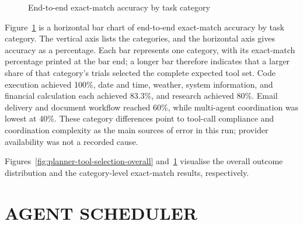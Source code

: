 \begin{figure}[H]
\centering
{}
\caption{End-to-end exact-match accuracy by task category}
\label{fig:planner-tool-selection-category}
\end{figure}

Figure~\ref{fig:planner-tool-selection-category} is a horizontal bar chart of end-to-end exact-match accuracy by task category. The vertical axis lists the categories, and the horizontal axis gives accuracy as a percentage. Each bar represents one category, with its exact-match percentage printed at the bar end; a longer bar therefore indicates that a larger share of that category's trials selected the complete expected tool set. Code execution achieved 100\%, date and time, weather, system information, and financial calculation each achieved 83.3\%, and research achieved 80\%. Email delivery and document workflow reached 60\%, while multi-agent coordination was lowest at 40\%. These category differences point to tool-call compliance and coordination complexity as the main sources of error in this run; provider availability was not a recorded cause.

Figures~\ref{fig:planner-tool-selection-overall} and~\ref{fig:planner-tool-selection-category} visualise the overall outcome distribution and the category-level exact-match results, respectively.

\section{\uppercase{Agent scheduler}}
\label{sec:agent-scheduler-evaluation}

